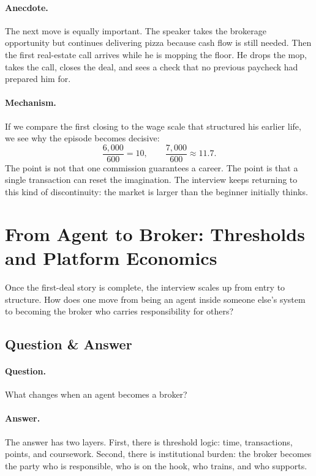\paragraph{Anecdote.}
The next move is equally important. The speaker takes the brokerage opportunity but continues delivering pizza because cash flow is still needed. Then the first real-estate call arrives while he is mopping the floor. He drops the mop, takes the call, closes the deal, and sees a check that no previous paycheck had prepared him for.

\paragraph{Mechanism.}
If we compare the first closing to the wage scale that structured his earlier life, we see why the episode becomes decisive:
\begin{equation}
\frac{6{,}000}{600}=10,
\qquad
\frac{7{,}000}{600}\approx 11.7.
\end{equation}
The point is not that one commission guarantees a career. The point is that a single transaction can reset the imagination. The interview keeps returning to this kind of discontinuity: the market is larger than the beginner initially thinks.

\section{From Agent to Broker: Thresholds and Platform Economics}

Once the first-deal story is complete, the interview scales up from entry to structure. How does one move from being an agent inside someone else's system to becoming the broker who carries responsibility for others?

\subsection{Question \& Answer}

\paragraph{Question.}
What changes when an agent becomes a broker?

\paragraph{Answer.}
The answer has two layers. First, there is threshold logic: time, transactions, points, and coursework. Second, there is institutional burden: the broker becomes the party who is responsible, who is on the hook, who trains, and who supports.

